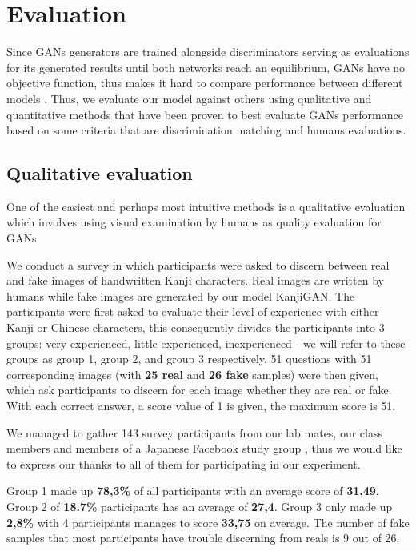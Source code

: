 \documentclass[12pt]{report}
\begin{document}
\section{Evaluation}
Since GANs generators are trained alongside discriminators serving as evaluations for its generated results until both networks reach an equilibrium, GANs have no objective function, thus makes it hard to compare performance between different models \cite{training-gans}.
Thus, we evaluate our model against others using qualitative and quantitative methods that have been proven to best evaluate GANs performance based on some criteria\cite{gan-measure} that are discrimination matching and humans evaluations.

\subsection{Qualitative evaluation}
One of the easiest and perhaps most intuitive methods is a qualitative evaluation which involves using visual examination by humans as quality evaluation for GANs.

We conduct a survey in which participants were asked to discern between real and fake images of handwritten Kanji characters. Real images are written by humans while fake images are generated by our model KanjiGAN. The participants were first asked to evaluate their level of experience with either Kanji or Chinese characters, this consequently divides the participants into 3 groups: very experienced, little experienced, inexperienced - we will refer to these groups as group 1, group 2, and group 3 respectively. 51 questions with 51 corresponding images (with \textbf{25 real} and \textbf{26 fake} samples) were then given, which ask participants to discern for each image whether they are real or fake. With each correct answer, a score value of 1 is given, the maximum score is 51.

We managed to gather 143 survey participants from our lab mates, our class members and members of a Japanese Facebook study group \cite{fb-group}, thus we would like to express our thanks to all of them for participating in our experiment.

Group 1 made up \textbf{78,3\%} of all participants with an average score of \textbf{31,49}. Group 2 of \textbf{18.7\%} participants has an average of \textbf{27,4}. Group 3 only made up \textbf{2,8\%} with 4 participants manages to score \textbf{33,75} on average. The number of fake samples that most participants have trouble discerning from reals is 9 out of 26.
\end{document}
